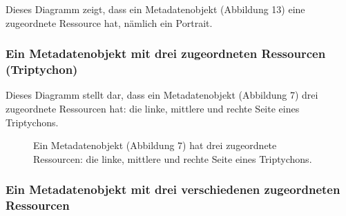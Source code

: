 \documentclass[
  letterpaper,
  DIV=11,
  numbers=noendperiod,
  landscape,
  a4paper,
  geometry:margin=1in]{scrartcl}
\begin{document}
Dieses Diagramm zeigt, dass ein Metadatenobjekt (Abbildung 13) eine
zugeordnete Ressource hat, nämlich ein Portrait.

\subsubsection{Ein Metadatenobjekt mit drei zugeordneten Ressourcen
(Triptychon)}\label{ein-metadatenobjekt-mit-drei-zugeordneten-ressourcen-triptychon}

Dieses Diagramm stellt dar, dass ein Metadatenobjekt (Abbildung 7) drei
zugeordnete Ressourcen hat: die linke, mittlere und rechte Seite eines
Triptychons.

\begin{figure}


\caption{\label{fig-metadata-2}Ein Metadatenobjekt (Abbildung 7) hat
drei zugeordnete Ressourcen: die linke, mittlere und rechte Seite eines
Triptychons.}

\end{figure}%

\subsubsection{Ein Metadatenobjekt mit drei verschiedenen zugeordneten
Ressourcen}\label{ein-metadatenobjekt-mit-drei-verschiedenen-zugeordneten-ressourcen}
\end{document}
